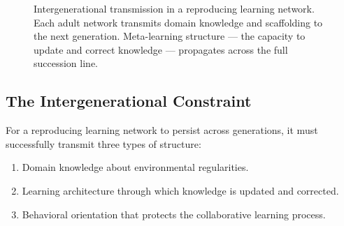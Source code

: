 \documentclass[11pt]{article}
\begin{document}
\begin{figure}[h]
\centering
{}
\caption{Intergenerational transmission in a reproducing learning network. Each adult
network transmits domain knowledge and scaffolding to the next generation. Meta-learning
structure --- the capacity to update and correct knowledge --- propagates across the full
succession line.}
\label{fig:intergenerational}
\end{figure}

\subsection{The Intergenerational Constraint}

For a reproducing learning network to persist across generations, it must successfully
transmit three types of structure:

\begin{enumerate}
    \item Domain knowledge about environmental regularities.
    \item Learning architecture through which knowledge is updated and corrected.
    \item Behavioral orientation that protects the collaborative learning process.
\end{enumerate}
\end{document}
